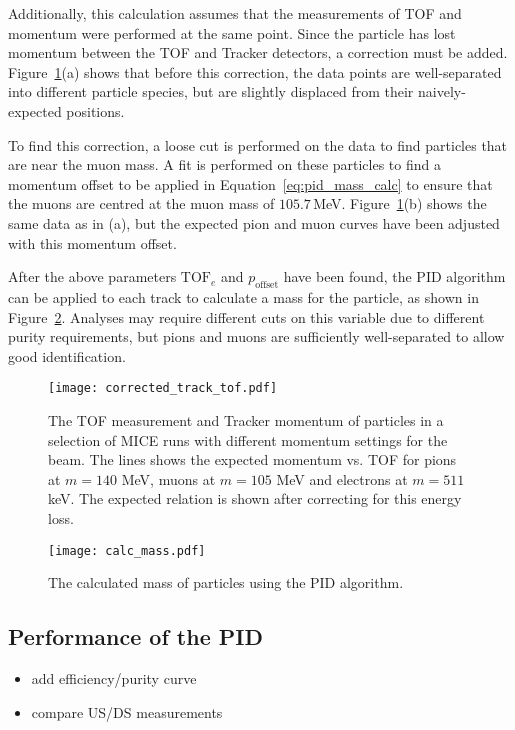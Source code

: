 Additionally, this calculation assumes that the measurements of TOF and momentum were performed at the same point.  Since the particle has lost momentum between the TOF and Tracker detectors, a correction must be added. Figure~\ref{fig:tof_track}(a) shows that before this correction, the data points are well-separated into different particle species, but are slightly displaced from their naively-expected positions.

To find this correction, a loose cut is performed on the data to find particles that are near the muon mass.  A fit is performed on these particles to find a momentum offset to be applied in Equation~\ref{eq:pid_mass_calc} to ensure that the muons are centred at the muon mass of $105.7$\,MeV.  Figure~\ref{fig:tof_track}(b) shows the same data as in (a), but the expected pion and muon curves have been adjusted with this momentum offset.

After the above parameters $\mathrm{TOF}_e$ and $p_\mathrm{offset}$ have been found, the PID algorithm can be applied to each track to calculate a mass for the particle, as shown in Figure~\ref{fig:pid_mass}.  Analyses may require different cuts on this variable due to different purity requirements, but pions and muons are sufficiently well-separated to allow good identification.

\begin{figure}[!ht]
\begin{center}
\texttt{[image: corrected\_track\_tof.pdf]}
\end{center}
\caption{The TOF measurement and Tracker momentum of particles in a selection of MICE runs with different momentum settings for the beam. The lines shows the expected momentum vs. TOF for pions at $m=140$ MeV, muons at $m=105$ MeV and electrons at $m=511$ keV. The expected relation is shown after correcting for this energy loss.}
\label{fig:tof_track}
\end{figure}

\begin{figure}[!ht]
\begin{center}
\texttt{[image: calc\_mass.pdf]}
\end{center}
\caption{The calculated mass of particles using the PID algorithm.}
\label{fig:pid_mass}
\end{figure}


\subsection{Performance of the PID}
\label{SubSect:PID_Performance}
{\color{red}
\begin{itemize}
\item add efficiency/purity curve
\item compare US/DS measurements
\end{itemize}
}


